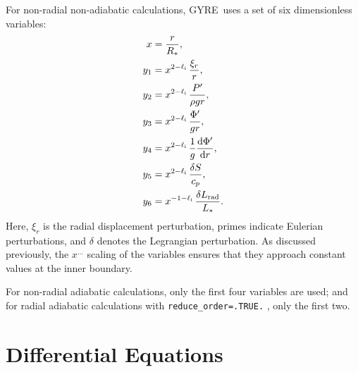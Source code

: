 \documentclass[fleqn]{article}
\newcommand{\gyre}{GYRE}
\newcommand{\diff}{\mathrm{d}}
\newcommand{\elli}{\ell_{\rm i}}
\newcommand{\Rstar}{R_{\ast}}
\newcommand{\Lrad}{L_{\rm rad}}
\newcommand{\Lstar}{L_{\ast}}
\begin{document}
For non-radial non-adiabatic calculations, \gyre\ uses a set of
six dimensionless variables:
\begin{align*}
x     &= \frac{r}{\Rstar}, \\
y_{1} &= x^{2-\elli}\, \frac{\xi_{r}}{r}, \\
y_{2} &= x^{2-\elli}\, \frac{P'}{\rho g r}, \\
y_{3} &= x^{2-\elli}\, \frac{\Phi'}{gr}, \\
y_{4} &= x^{2-\elli}\, \frac{1}{g} \frac{\diff \Phi'}{\diff r}, \\
y_{5} &= x^{2-\elli}\, \frac{\delta S}{c_{p}}, \\
y_{6} &= x^{-1-\elli}\, \frac{\delta \Lrad}{\Lstar}.
\end{align*}
Here, $\xi_{r}$ is the radial displacement perturbation, primes
indicate Eulerian perturbations, and $\delta$ denotes the Legrangian
perturbation. As discussed previously, the $x^{\ldots}$ scaling of
the variables ensures that they approach constant values at the
inner boundary.

For non-radial adiabatic calculations, only the first four variables
are used; and for radial adiabatic calculations with
\texttt{reduce\_order=.TRUE.} , only the first two.


\section*{Differential Equations}
\end{document}
